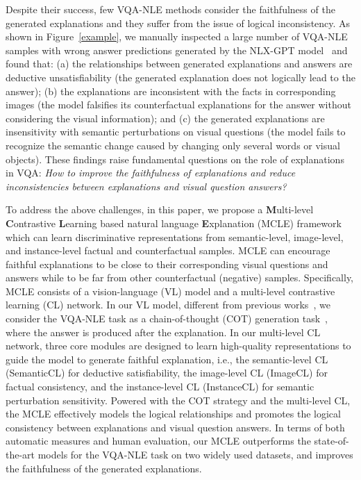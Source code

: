 \documentclass[letterpaper]{article} %
\begin{document}
Despite their success, few VQA-NLE methods consider the faithfulness of the generated explanations and they suffer from the issue of logical inconsistency. As shown in Figure~\ref{example}, we manually inspected a large number of VQA-NLE samples with wrong answer predictions generated by the NLX-GPT model~\cite{sammani2022nlx} and found that: (a) the relationships between generated explanations and answers are deductive unsatisfiability (the generated explanation does not logically lead to the answer); (b) the explanations are inconsistent with the facts in corresponding images (the model falsifies its counterfactual explanations for the answer without considering the visual information); and (c) the generated explanations are insensitivity with semantic perturbations on visual questions (the model fails to recognize the semantic change caused by changing only several words or visual objects). These findings raise fundamental questions on the role of explanations in VQA: {\it How to improve the faithfulness of explanations and reduce inconsistencies between explanations and visual question answers? }

To address the above challenges, in this paper, we propose a \textbf{M}ulti-level \textbf{C}ontrastive \textbf{L}earning based natural language \textbf{E}xplanation (MCLE) framework which can learn discriminative representations from semantic-level, image-level, and instance-level factual and counterfactual samples. MCLE can encourage faithful explanations to be close to their corresponding visual questions and answers while to be far from other counterfactual (negative) samples. Specifically, MCLE consists of a vision-language (VL) model and a multi-level contrastive learning (CL) network. In our VL model, different from previous works~\cite{sammani2022nlx,suo2023s3c}, we consider the VQA-NLE task as a chain-of-thought (COT) generation task~\cite{wei2022chain}, where the answer is produced after the explanation. In our multi-level CL network, three core modules are designed to learn high-quality representations to guide the model to generate faithful explanation, i.e., the semantic-level CL (SemanticCL) for deductive satisfiability, the image-level CL (ImageCL) for factual consistency, and the instance-level CL (InstanceCL) for semantic perturbation sensitivity. Powered with the COT strategy and the multi-level CL, the MCLE effectively models the logical relationships and promotes the logical consistency between explanations and visual question answers. In terms of both automatic measures and human evaluation, our MCLE outperforms the state-of-the-art models for the VQA-NLE task on two widely used datasets, and improves the faithfulness of the generated explanations.
\end{document}
